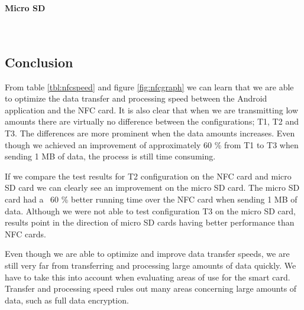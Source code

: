 \newpage
\paragraph{Micro SD}\mbox{}\\


\newpage
\subsection{Conclusion}
From table \ref{tbl:nfcspeed} and figure \ref{fig:nfcgraph} we can learn that we are able to optimize the data transfer and processing speed between the Android application and the NFC card. It is also clear that when we are transmitting low amounts there are virtually no difference between the configurations; T1, T2 and T3. The differences are more prominent when the data amounts increases. Even though we achieved an improvement of approximately 60 \% from T1 to T3 when sending 1 MB of data, the process is still time consuming.

If we compare the test results for T2 configuration on the NFC card and micro SD card we can clearly see an improvement on the micro SD card. The micro SD card had a ~60 \%  better running time over the NFC card when sending 1 MB of data. Although we were not able to test configuration T3 on the micro SD card, results point in the direction of micro SD cards having better performance than NFC cards.

Even though we are able to optimize and improve data transfer speeds, we are still very far from transferring and processing large amounts of data quickly. We have to take this into account when evaluating areas of use for the smart card. Transfer and processing speed rules out many areas concerning large amounts of data, such as full data encryption.
